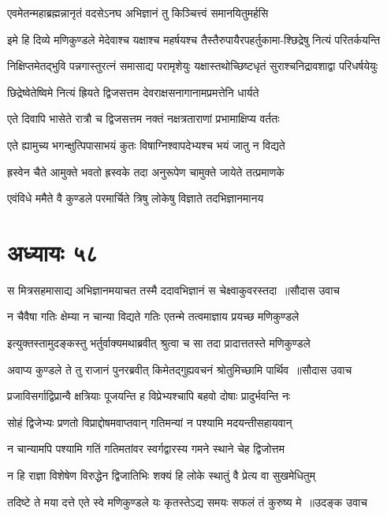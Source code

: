\twolineshloka
{एवमेतन्महाब्रह्मन्नानृतं वदसेऽनघ}
{अभिज्ञानं तु किञ्चित्त्वं समानयितुमर्हसि}


\twolineshloka
{इमे हि दिव्ये मणिकुण्डले मेदेवाश्च यक्षाश्च महर्षयश्च}
{तैस्तैरुपायैरपहर्तुकामा-श्छिद्रेषु नित्यं परितर्कयन्ति}


\twolineshloka
{निक्षिप्तमेतद्भुवि पन्नगास्तुरत्नं समासाद्य परामृशेयुः}
{यक्षास्तथोच्छिष्टधृतं सुराश्चनिद्रावशाद्वा परिधर्षयेयुः}


\twolineshloka
{छिद्रेष्वेतेष्विमे नित्यं ह्रियते द्विजसत्तम}
{देवराक्षसनागानामप्रमत्तेनि धार्यते}


\twolineshloka
{एते दिवापि भासेते रात्रौ च द्विजसत्तम}
{नक्तं नक्षत्रताराणां प्रभामाक्षिप्य वर्ततः}


\twolineshloka
{एते ह्यामुच्य भगन्क्षुत्पिपासाभयं कुतः}
{विषाग्निश्वापदेभ्यश्च भयं जातु न विद्यते}


\twolineshloka
{ह्रस्वेन चैते आमुक्ते भवतो ह्रस्वके तदा}
{अनुरूपेण चामुक्ते जायेते तत्प्रमाणके}


\twolineshloka
{एवंविधे ममैते वै कुण्डले परमार्चिते}
{त्रिषु लोकेषु विज्ञाते तदभिज्ञानमानय}


\chapter{अध्यायः ५८}
\threelineshloka
{स मित्रसहमासाद्य अभिज्ञानमयाचत}
{तस्मै ददावभिज्ञानं स चेक्ष्वाकुवरस्तदा ॥सौदास उवाच}
{}


\twolineshloka
{न चैवैषा गतिः क्षेम्या न चान्या विद्यते गतिः}
{एतन्मे तत्वमाज्ञाय प्रयच्छ मणिकुण्डले}


\twolineshloka
{इत्युक्तस्तामुदङ्कस्तु भर्तुर्वाक्यमथाब्रवीत्}
{श्रुत्वा च सा तदा प्रादात्ततस्ते मणिकुण्डले}


\threelineshloka
{अवाप्य कुण्डले ते तु राजानं पुनरब्रवीत्}
{किमेतद्गुह्यवचनं श्रोतुमिच्छामि पार्थिव ॥सौदास उवाच}
{}


\twolineshloka
{प्रजाविसर्गाद्विप्रान्वै क्षत्रियाः पूजयन्ति ह}
{विप्रेभ्यश्चापि बहवो दोषाः प्रादुर्भवन्ति नः}


\twolineshloka
{सोहं द्विजेभ्यः प्रणतो विप्राद्दोषमवाप्तवान्}
{गतिमन्यां न पश्यामि मदयन्तीसहायवान्}


\twolineshloka
{न चान्यामपि पश्यामि गतिं गतिमतांवर}
{स्वर्गद्वारस्य गमने स्थाने चेह द्विजोत्तम}


\twolineshloka
{न हि राज्ञा विशेषेण विरुद्धेन द्विजातिभिः}
{शक्यं हि लोके स्थातुं वै प्रेत्य वा सुखमेधितुम्}


\threelineshloka
{तदिष्टे ते मया दत्ते एते स्वे मणिकुण्डले}
{यः कृतस्तेऽद्य समयः सफलं तं कुरुष्य मे ॥उदङ्क उवाच}
{}


